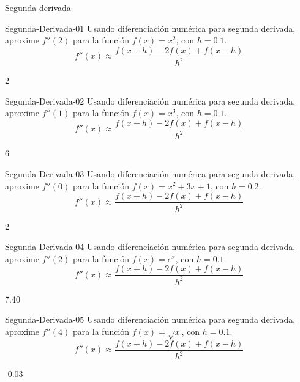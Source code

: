 \documentclass[a4,11pt]{aleph-notas}
\begin{document}
\begin{quiz}{Segunda derivada}
\begin{numerical}[tolerance=0.01]%
    {Segunda-Derivada-01}
    Usando diferenciación numérica para segunda derivada, aproxime \( f''(2) \) para la función \( f(x)=x^2 \), con \( h=0.1 \).
    \[
        f''(x)\approx \frac{f(x+h)-2f(x)+f(x-h)}{h^2}
    \]
    \item 2
\end{numerical}

\begin{numerical}[tolerance=0.01]%
    {Segunda-Derivada-02}
    Usando diferenciación numérica para segunda derivada, aproxime \( f''(1) \) para la función \( f(x)=x^3 \), con \( h=0.1 \).
    \[
        f''(x)\approx \frac{f(x+h)-2f(x)+f(x-h)}{h^2}
    \]
    \item 6
\end{numerical}

\begin{numerical}[tolerance=0.01]%
    {Segunda-Derivada-03}
    Usando diferenciación numérica para segunda derivada, aproxime \( f''(0) \) para la función \( f(x)=x^2+3x+1 \), con \( h=0.2 \).
    \[
        f''(x)\approx \frac{f(x+h)-2f(x)+f(x-h)}{h^2}
    \]
    \item 2
\end{numerical}

\begin{numerical}[tolerance=0.01]%
    {Segunda-Derivada-04}
    Usando diferenciación numérica para segunda derivada, aproxime \( f''(2) \) para la función \( f(x)=e^x \), con \( h=0.1 \).
    \[
        f''(x)\approx \frac{f(x+h)-2f(x)+f(x-h)}{h^2}
    \]
    \item 7.40
\end{numerical}

\begin{numerical}[tolerance=0.01]%
    {Segunda-Derivada-05}
    Usando diferenciación numérica para segunda derivada, aproxime \( f''(4) \) para la función \( f(x)=\sqrt{x} \), con \( h=0.1 \).
    \[
        f''(x)\approx \frac{f(x+h)-2f(x)+f(x-h)}{h^2}
    \]
    \item -0.03
\end{numerical}

\end{quiz}
\end{document}
